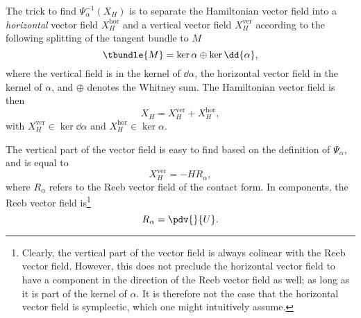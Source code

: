 The trick to find $\Psi_\alpha^{-1}(X_H)$ is to separate the Hamiltonian vector field into a \emph{horizontal} vector field $X^\text{hor}_H$  and a vertical vector field $X^\text{ver}_H$ according to the following splitting of the tangent bundle to $M$ \cite{Libermann1987}
$$ \tbundle{M} = \ker \alpha \oplus \ker \dd{\alpha},$$
where the vertical field is in the kernel of $ \dd{\alpha}$, the horizontal vector field in the kernel of $\alpha$, and $\oplus$ denotes the Whitney sum. The Hamiltonian vector field is then 
$$ X_H = X_H^\text{ver} + X_H^\text{hor}, $$
with $X_H^\text{ver} \in \ker \dd{\alpha}$ and $X_H^\text{hor} \in \ker \alpha$.

The vertical part of the vector field is easy to find based on the definition of $\Psi_\alpha$, and is equal to
\begin{equation}
    X_H^\text{ver} = - H R_\alpha, 
    \label{eq:vertical_vf}
\end{equation}
where $R_\alpha$ refers to the Reeb vector field of the contact form. In components, the Reeb vector field is\footnote
{
    Clearly, the vertical part of the vector field is always colinear with the Reeb vector field. However, this does not preclude the horizontal vector field to have a component in the direction of the Reeb vector field as well; as long as it is part of the kernel of $\alpha$. It is therefore not the case that the horizontal vector field is symplectic, which one might intuitively assume.
}
$$ 
    R_\alpha = \pdv{}{U}.
$$ 

